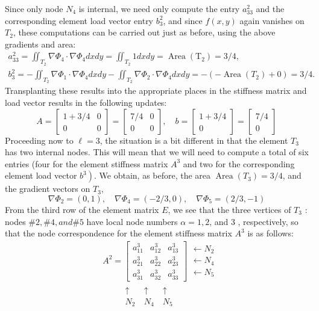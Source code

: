 \documentclass[../main.tex]{subfiles}
\begin{document}
Since only node $N_{4}$ is internal, we need only compute the entry $a_{33}^{2}$ and the corresponding element load vector entry $b_{3}^{2}$, and since $f(x, y)$ again vanishes on $T_{2}$, these computations can be carried out just as before, using the above gradients and area:
$$
\begin{gathered}
a_{33}^{2}=\iint_{T_{2}} \nabla \Phi_{4} \cdot \nabla \Phi_{4} d x d y=\iint_{T_{2}} 1 d x d y=\operatorname{Area}\left(\mathrm{T}_{2}\right)=3 / 4, \\
b_{3}^{2}=-\iint_{T_{2}} \nabla \Phi_{1} \cdot \nabla \Phi_{4} d x d y-\iint_{T_{2}} \nabla \Phi_{2} \cdot \nabla \Phi_{4} d x d y=-\left(-\operatorname{Area}\left(T_{2}\right)+0\right)=3 / 4 .
\end{gathered}
$$
Transplanting these results into the appropriate places in the stiffness matrix and load vector results in the following updates:
$$
A=\left[\begin{array}{cc}
1+3 / 4 & 0 \\
0 & 0
\end{array}\right]=\left[\begin{array}{cc}
7 / 4 & 0 \\
0 & 0
\end{array}\right], \quad b=\left[\begin{array}{c}
1+3 / 4 \\
0
\end{array}\right]=\left[\begin{array}{c}
7 / 4 \\
0
\end{array}\right]
$$
Proceeding now to $\ell=3$, the situation is a bit different in that the element $T_{3}$ has two internal nodes. This will mean that we will need to compute a total of six entries (four for the element stiffness matrix $A^{3}$ and two for the corresponding element load vector $\left.b^{3}\right)$. We obtain, as before, the area $\operatorname{Area}\left(T_{3}\right)=3 / 4$, and the gradient vectors on $T_{3}$,
$$
\nabla \Phi_{2}=(0,1), \quad \nabla \Phi_{4}=(-2 / 3,0), \quad \nabla \Phi_{5}=(2 / 3,-1)
$$
From the third row of the element matrix $E$, we see that the three vertices of $T_{3}$ : nodes $\#2, \#4, and \#5$ have local node numbers $\alpha=1,2$, and 3 , respectively, so that the node correspondence for the element stiffness matrix $A^{3}$ is as follows:
$$
\begin{aligned}
&A^{2}=\left[\begin{array}{lll}
a_{11}^{3} & a_{12}^{3} & a_{13}^{3} \\
a_{21}^{3} & a_{22}^{3} & a_{23}^{3} \\
a_{31}^{3} & a_{32}^{3} & a_{33}^{3}
\end{array}\right] \begin{array}{lll}
\leftarrow N_{2}\\
\leftarrow N_{4}\\
\leftarrow N_{5}
\end{array}
\\
&\begin{array}{ccccc}
~&~&~\uparrow &~\uparrow &~\uparrow\\
~&~&~N_{2}&~N_{4}&~N_{5}
\end{array}
\end{aligned}
$$
\end{document}
